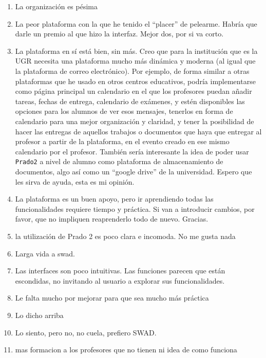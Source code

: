 \begin{enumerate}
\item La organización es pésima
\item La peor plataforma con la que he tenido el ``placer'' de pelearme. Habría que darle un premio al que hizo la interfaz. Mejor dos, por si va corto.
\item La plataforma en sí está bien, sin más. Creo que para la institución que es la UGR necesita una plataforma mucho más dinámica y moderna (al igual que la plataforma de correo electrónico). Por ejemplo, de forma similar a otras plataformas que he usado en otros centros educativos, podría implementarse como página principal un calendario en el que los profesores puedan añadir tareas, fechas de entrega, calendario de exámenes, y estén disponibles las opciones para los alumnos de ver esos mensajes, tenerlos en forma de calendario para una mejor organización y claridad, y tener la posibilidad de hacer las entregas de aquellos trabajos o documentos que haya que entregar al profesor a partir de la plataforma, en el evento creado en ese mismo calendario por el profesor. También sería interesante la idea de poder usar \texttt{Prado2} a nivel de alumno como plataforma de almacenamiento de documentos, algo así como un ``google drive'' de la universidad. Espero que les sirva de ayuda, esta es mi opinión.
\item La plataforma es un buen apoyo, pero ir aprendiendo todas las funcionalidades requiere tiempo y práctica. Si van a introducir cambios, por favor, que no impliquen reaprenderlo todo de nuevo. Gracias.
\item la utilización de Prado 2 es poco clara e incomoda. No me gusta nada
\item Larga vida a swad.
\item Las interfaces son poco intuitivas. Las funciones parecen que están escondidas, no invitando al usuario a explorar sus funcionalidades.
\item Le falta mucho por mejorar para que sea mucho más práctica
\item Lo dicho arriba
\item Lo siento, pero no, no cuela, prefiero SWAD.
\item mas formacion a los profesores que no tienen ni idea de como funciona

\end{enumerate}
